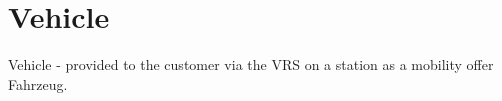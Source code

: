%
%
%
\section*{Vehicle}

Vehicle - provided to the customer via the VRS on a station as a mobility offer Fahrzeug.

